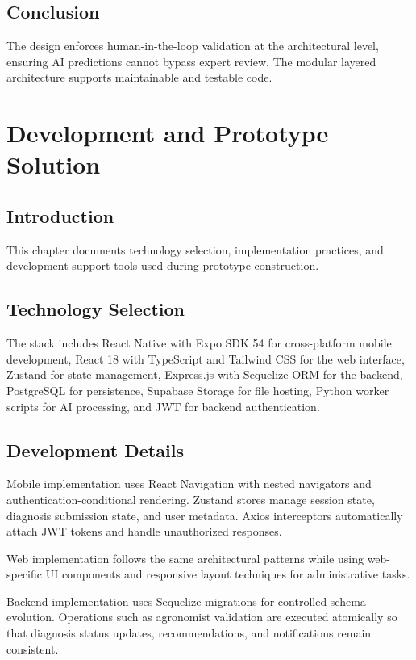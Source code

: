 \documentclass[12pt]{article}
\begin{document}
\subsection{Conclusion}
The design enforces human-in-the-loop validation at the architectural level, ensuring AI predictions cannot bypass expert review. The modular layered architecture supports maintainable and testable code.

\newpage
\section{Development and Prototype Solution}

\subsection{Introduction}
This chapter documents technology selection, implementation practices, and development support tools used during prototype construction.

\subsection{Technology Selection}
The stack includes React Native with Expo SDK 54 for cross-platform mobile development, React 18 with TypeScript and Tailwind CSS for the web interface, Zustand for state management, Express.js with Sequelize ORM for the backend, PostgreSQL for persistence, Supabase Storage for file hosting, Python worker scripts for AI processing, and JWT for backend authentication.

\subsection{Development Details}
Mobile implementation uses React Navigation with nested navigators and authentication-conditional rendering. Zustand stores manage session state, diagnosis submission state, and user metadata. Axios interceptors automatically attach JWT tokens and handle unauthorized responses.

Web implementation follows the same architectural patterns while using web-specific UI components and responsive layout techniques for administrative tasks.

Backend implementation uses Sequelize migrations for controlled schema evolution. Operations such as agronomist validation are executed atomically so that diagnosis status updates, recommendations, and notifications remain consistent.
\end{document}
